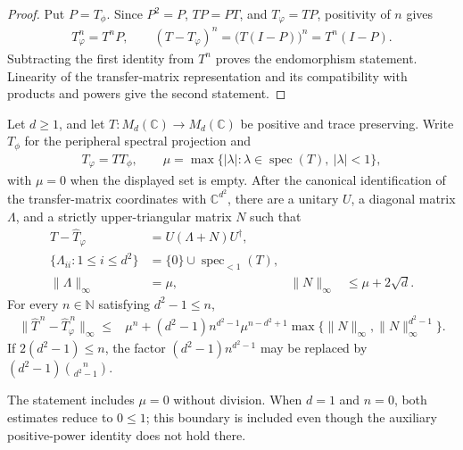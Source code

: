 \begin{proof}
    \leanok
    Put $P=T_\phi$.  Since $P^2=P$, $TP=PT$, and
    $T_\varphi=TP$, positivity of $n$ gives
    \begin{align}
      T_\varphi^n=T^nP,
      \qquad
      (T-T_\varphi)^n
        =\bigl(T(I-P)\bigr)^n=T^n(I-P).
    \end{align}
    Subtracting the first identity from $T^n$ proves the endomorphism
    statement.  Linearity of the transfer-matrix representation and its
    compatibility with products and powers give the second statement.
\end{proof}

\begin{theorem}
    \label{thm:wolf_asymptotic_convergence_ii}
    \leanok
    Let $d\ge1$, and let $T:M_d(\mathbb C)\to M_d(\mathbb C)$ be positive
    and trace preserving.  Write $T_\phi$ for the peripheral spectral
    projection and
    \begin{align}
      T_\varphi=T T_\phi,
      \qquad
      \mu=\max\{\lvert\lambda\rvert:
        \lambda\in\operatorname{spec}(T),\ \lvert\lambda\rvert<1\},
    \end{align}
    with $\mu=0$ when the displayed set is empty.  After the canonical
    identification of the transfer-matrix coordinates with
    $\mathbb C^{d^2}$, there are a unitary $U$, a diagonal matrix $\Lambda$,
    and a strictly upper-triangular matrix $N$ such that
    \begin{align}
      \widehat T-\widehat T_\varphi
        &=U(\Lambda+N)U^\dagger,\\
      \{\Lambda_{ii}:1\le i\le d^2\}
        &=\{0\}\cup\operatorname{spec}_{<1}(T),\\
      \lVert\Lambda\rVert_\infty&=\mu,
      &\lVert N\rVert_\infty&\le\mu+2\sqrt d.
    \end{align}
    For every $n\in\mathbb N$ satisfying $d^2-1\le n$,
    \begin{align}
      \lVert\widehat T^{\,n}-\widehat T_\varphi^{\,n}\rVert_\infty
      \le{}&\mu^n
      +(d^2-1)n^{d^2-1}\mu^{n-d^2+1}
        \max\{\lVert N\rVert_\infty,
          \lVert N\rVert_\infty^{d^2-1}\}.
    \end{align}
    If $2(d^2-1)\le n$, the factor
    $(d^2-1)n^{d^2-1}$ may be replaced by
    $(d^2-1)\binom{n}{d^2-1}$.

    The statement includes $\mu=0$ without division.  When $d=1$ and $n=0$,
    both estimates reduce to $0\le1$; this boundary is included even though
    the auxiliary positive-power identity does not hold there.
\end{theorem}

